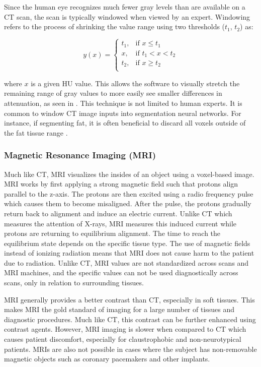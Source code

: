 Since the human eye recognizes much fewer gray levels than are available on a CT scan, the scan is typically windowed when viewed by an expert. Windowing refers to the process of shrinking the value range using two thresholds ($t_1$, $t_2$) as:

\begin{equation}
y(x) = 
    \begin{cases}
        t_1, & \text{if } x \leq t_1\\
        x, & \text{if } t_1 < x < t_2\\
        	t_2, & \text{if } x \geq t_2\\
    \end{cases}
\end{equation}

where $x$ is a given HU value. This allows the software to visually stretch the remaining range of gray values to more easily see smaller differences in attenuation, as seen in . This technique is not limited to human experts. It is common to window CT image inputs into segmentation neural networks. For instance, if segmenting fat, it is often beneficial to discard all voxels outside of the fat tissue range \cite{bencevicRecentProgressEpicardial2022}.


\subsubsection{Magnetic Resonance Imaging (MRI)}

Much like CT, MRI visualizes the insides of an object using a voxel-based image. MRI works by first applying a strong magnetic field such that protons align parallel to the z-axis. The protons are then excited using a radio frequency pulse which causes them to become misaligned. After the pulse, the protons gradually return back to alignment and induce an electric current. Unlike CT which measures the attention of X-rays, MRI measures this induced current while protons are returning to equilibrium alignment. The time to reach the equilibrium state depends on the specific tissue type. The use of magnetic fields instead of ionizing radiation means that MRI does not cause harm to the patient due to radiation. Unlike CT, MRI values are not standardized across scans and MRI machines, and the specific values can not be used diagnostically across scans, only in relation to surrounding tissues.

MRI generally provides a better contrast than CT, especially in soft tissues. This makes MRI the gold standard of imaging for a large number of tissues and diagnostic procedures. Much like CT, this contrast can be further enhanced using contrast agents. However, MRI imaging is slower when compared to CT which causes patient discomfort, especially for claustrophobic and non-neurotypical patients. MRIs are also not possible in cases where the subject has non-removable magnetic objects such as coronary pacemakers and other implants.

